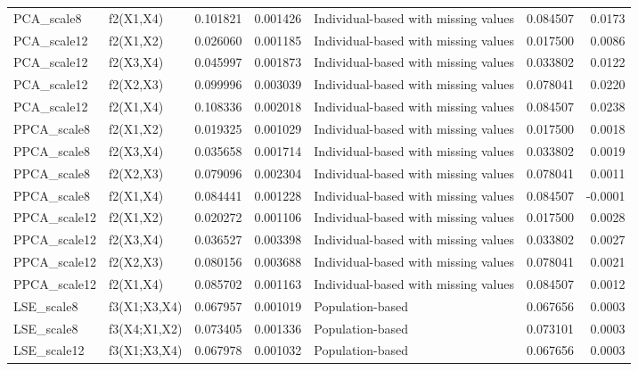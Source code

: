 \begin{tabular}{llrrlrr}
  PCA\_scale8 &       f2(X1,X4) & 0.101821 &        0.001426 & Individual-based with missing values &    0.084507 &  0.0173 \\
 PCA\_scale12 &       f2(X1,X2) & 0.026060 &        0.001185 & Individual-based with missing values &    0.017500 &  0.0086 \\
 PCA\_scale12 &       f2(X3,X4) & 0.045997 &        0.001873 & Individual-based with missing values &    0.033802 &  0.0122 \\
 PCA\_scale12 &       f2(X2,X3) & 0.099996 &        0.003039 & Individual-based with missing values &    0.078041 &  0.0220 \\
 PCA\_scale12 &       f2(X1,X4) & 0.108336 &        0.002018 & Individual-based with missing values &    0.084507 &  0.0238 \\
 PPCA\_scale8 &       f2(X1,X2) & 0.019325 &        0.001029 & Individual-based with missing values &    0.017500 &  0.0018 \\
 PPCA\_scale8 &       f2(X3,X4) & 0.035658 &        0.001714 & Individual-based with missing values &    0.033802 &  0.0019 \\
 PPCA\_scale8 &       f2(X2,X3) & 0.079096 &        0.002304 & Individual-based with missing values &    0.078041 &  0.0011 \\
 PPCA\_scale8 &       f2(X1,X4) & 0.084441 &        0.001228 & Individual-based with missing values &    0.084507 & -0.0001 \\
PPCA\_scale12 &       f2(X1,X2) & 0.020272 &        0.001106 & Individual-based with missing values &    0.017500 &  0.0028 \\
PPCA\_scale12 &       f2(X3,X4) & 0.036527 &        0.003398 & Individual-based with missing values &    0.033802 &  0.0027 \\
PPCA\_scale12 &       f2(X2,X3) & 0.080156 &        0.003688 & Individual-based with missing values &    0.078041 &  0.0021 \\
PPCA\_scale12 &       f2(X1,X4) & 0.085702 &        0.001163 & Individual-based with missing values &    0.084507 &  0.0012 \\
  LSE\_scale8 &    f3(X1;X3,X4) & 0.067957 &        0.001019 &                     Population-based &    0.067656 &  0.0003 \\
  LSE\_scale8 &    f3(X4;X1,X2) & 0.073405 &        0.001336 &                     Population-based &    0.073101 &  0.0003 \\
 LSE\_scale12 &    f3(X1;X3,X4) & 0.067978 &        0.001032 &                     Population-based &    0.067656 &  0.0003 \\

\end{tabular}
